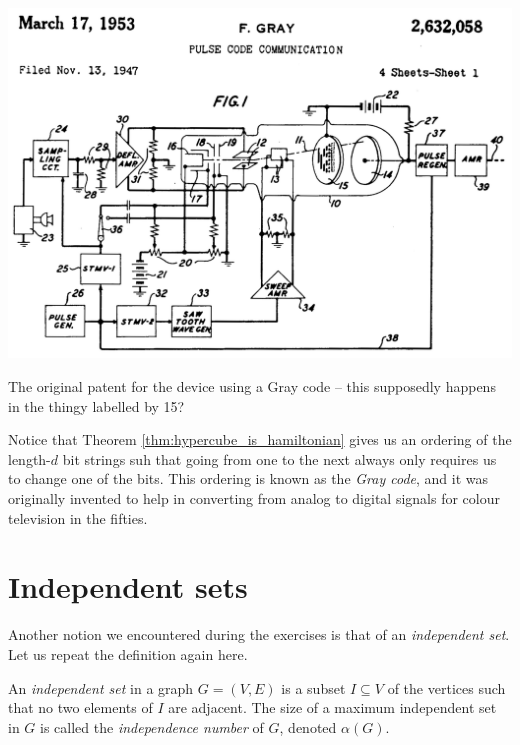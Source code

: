 \documentclass[nobib]{tufte-handout}
\begin{document}
\begin{marginfigure}
    \centering
    \includegraphics[width=1.0\textwidth]{graphics/L8_vx_covers_hamiltonicity_etc/gray_code_patent.png}
    \caption{The original patent for the device using a Gray code -- this supposedly happens in the thingy labelled by 15?}
    \label{fig:gray_code_patent}
\end{marginfigure}

\begin{remark}
    Notice that Theorem \ref{thm:hypercube_is_hamiltonian} gives us an ordering of the length-$d$ bit strings suh that going from one to the next always only requires us to change one of the bits. This ordering is known as the \emph{Gray code}, and it was originally invented to help in converting from analog to digital signals for colour television in the fifties.
\end{remark}

\section{Independent sets}

Another notion we encountered during the exercises is that of an \emph{independent set}. Let us repeat the definition again here.

\begin{definition}
    An \emph{independent set} in a graph $G = (V,E)$ is a subset $I \subseteq V$ of the vertices such that no two elements of $I$ are adjacent. The size of a maximum independent set in $G$ is called the \emph{independence number} of $G$, denoted $\alpha(G)$.
\end{definition}
\end{document}
